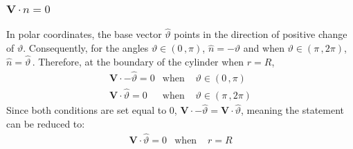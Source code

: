 \documentclass[a4paper,12pt]{article}
\newcommand{\nhat}{\hat{n}}
\newcommand{\thetahat}{\hat{\theta}}
\renewcommand{\theta}{\vartheta}      		%
\begin{document}
\subsubsection{$\mathbf{V}\cdot\nhat=0$}
In polar coordinates, the base vector $\thetahat$ points in the direction of positive change of $\theta$. Consequently, for the angles $\theta\in(0\,,\pi)$, $\nhat=-\thetahat$ and when $\theta\in(\pi\,,2\pi)$, $\nhat=\thetahat$\,. Therefore, at the boundary of the cylinder when $r=R$,
$$\begin{matrix}
	\mathbf{V}\cdot-\thetahat=0&\text{when }&\theta\in(0\,,\pi)\\
	\mathbf{V}\cdot\thetahat=0&\text{when }&\theta\in(\pi\,,2\pi)
\end{matrix}$$
Since both conditions are set equal to 0, $\mathbf{V}\cdot-\thetahat=\mathbf{V}\cdot\thetahat$, meaning the statement can be reduced to:
$$\begin{matrix}
	\mathbf{V}\cdot\thetahat=0&\text{when }&r=R
\end{matrix}$$
\end{document}
